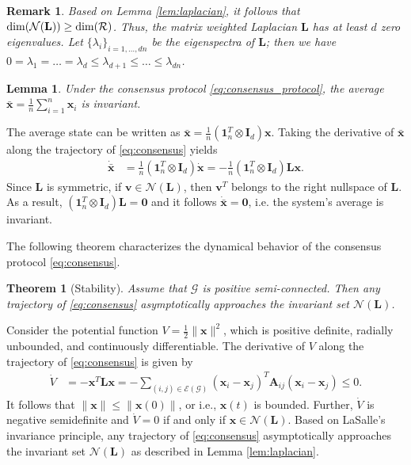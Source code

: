 \documentclass[draftclsnofoot,11pt,onecolumn]{IEEEtran}
\newtheorem{Theorem}{Theorem}
\newtheorem{Lemma}{Lemma}
\newtheorem{Remark}{Remark}
\newcommand{\m}[1]{\mathbf{#1}}
\newcommand{\mc}[1]{\mathcal{#1}}
\begin{document}
\begin{Remark}\label{remark:zero_eig_of_L}
Based on Lemma \ref{lem:laplacian}, it follows that $\rm{dim}( \mc{N}(\m{L}) ) \geq \rm{dim} (\mc{R})$. Thus, the matrix weighted Laplacian $\m{L}$ has at least $d$ zero eigenvalues. Let $\{\lambda_i\}_{i=1,\ldots, dn}$ be the eigenspectra of $\m{L}$; then we have $0 = \lambda_1 = \ldots = \lambda_d \leq \lambda_{d+1} \leq \ldots \leq \lambda_{dn}$.
\end{Remark}

%
\begin{Lemma}\label{lem:centroid_invariance}
Under the consensus protocol \eqref{eq:consensus_protocol}, the average $\bar{\m{x}} = \frac{1}{n}\sum_{i=1}^n \m{x}_{i}$ is invariant.
\end{Lemma}
\begin{IEEEproof}
The average state can be written as $\bar{\m{x}} = \frac{1}{n}(\m{1}_n^T \otimes \m{I}_{d}) \m{x}$. Taking the derivative of $\bar{\m{x}}$ along the trajectory of \eqref{eq:consensus} yields
\begin{align}
\dot{\bar{\m{x}}} &= \frac{1}{n}(\m{1}_n^T \otimes \m{I}_{d}) \dot{\m{x}} = -\frac{1}{n}(\m{1}_n^T \otimes \m{I}_{d}) {\m{L}} \m{x}.
\end{align}
Since $\m{L}$ is symmetric, if $\m{v} \in \mc{N}(\m{L})$, then $\m{v}^T$ belongs to the right nullspace of $\m{L}$. As a result, $(\m{1}_n^T \otimes \m{I}_{d})  {\m{L}} = \m{0}$ and it follows $\dot{\bar{\m{x}}} = \m{0}$, i.e. the system's average is invariant.
\end{IEEEproof}

The following theorem characterizes the dynamical behavior of the consensus protocol \eqref{eq:consensus}. 
\begin{Theorem}[Stability]\label{thm:stability} Assume that $\mc{G}$ is positive semi-connected. Then any trajectory of \eqref{eq:consensus} asymptotically approaches the invariant set $\mc{N}(\m{L})$.
\end{Theorem}
%
\begin{IEEEproof}
Consider the potential function $V = \frac{1}{2} \|\m{x}\|^2$, 
which is positive definite, radially unbounded, and continuously differentiable. The derivative of $V$ along the trajectory of \eqref{eq:consensus} is given by
\begin{align*}
\dot{V} &= -\m{x}^T \m{L} \m{x} = -\sum_{(i,j) \in \mc{E}(\mc{G})} (\m{x}_i - \m{x}_j)^T \m{A}_{ij} (\m{x}_i - \m{x}_j) \leq 0.
\end{align*}
It follows that $\|\m{x}\| \leq \|\m{x}(0)\|$, or i.e., $\m{x}(t)$ is bounded. Further, $\dot{V}$ is negative semidefinite and $\dot{V}=0$ if and only if $\m{x} \in \mc{N}(\m{L})$. Based on LaSalle's invariance principle, any trajectory of \eqref{eq:consensus} asymptotically approaches the invariant set $\mc{N}(\m{L})$ as described in Lemma \ref{lem:laplacian}.
\end{IEEEproof}
%
\end{document}
